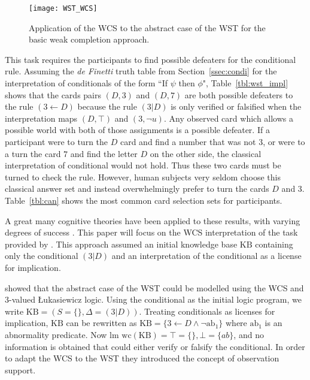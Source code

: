 \begin{figure}
\centering \texttt{[image: WST\_WCS]}
\caption{Application of the WCS to the abstract case of the WST for the basic weak completion approach.}
\label{wst_wcs}
\end{figure}

This task requires the participants to find possible defeaters for the conditional rule. Assuming the \textit{de Finetti} truth table from Section~\ref{ssec:condi} for the interpretation of conditionals of the form ``If $\psi$ then $\phi$", Table~\ref{tbl:wst_impl} shows that the cards pairs $(D,3)$ and $(D,7)$ are both possible defeaters to the rule $(3 \leftarrow D)$ because the rule $(3|D)$ is only verified or falsified when the interpretation maps $(D,\top)$ and $(3, \lnot u)$. Any observed card which allows a possible world with both of those assignments is a possible defeater. If a participant were to turn the $D$ card and find a number that was not $3$, or were to a turn the card $7$ and find the letter $D$ on the other side, the classical interpretation of conditional would not hold. Thus these two cards must be turned to check the rule. However, human subjects very seldom choose this classical answer set and instead overwhelmingly prefer to turn the cards $D$ and $3$. Table~\ref{tbl:can} shows the most common card selection sets for participants.

A great many cognitive theories have been applied to these results, with varying degrees of success \citep{ragni2017formal}. This paper will focus on the WCS interpretation of the task provided by \cite{ragni2017wason}. This approach assumed an initial knowledge base $\text{KB}$ containing only the conditional $(3|D)$ and an interpretation of the conditional as a license for implication.

\cite{dietz2012computational} showed that the abstract case of the WST could be modelled using the WCS and 3-valued \L ukasiewicz logic. Using the conditional as the initial logic program, we write $\text{KB}=(S=\{\},\Delta=(3|D))$. Treating conditionals as licenses for implication, $\text{KB}$ can be rewritten as $\text{KB}=\{3\leftarrow D \land \lnot \text{ab}_1\}$ where $\text{ab}_1$ is an abnormality predicate. Now $\textrm{lm wc}(\text{KB})=\top=\{\},\bot=\{ab\}$, and no information is obtained that could either verify or falsify the conditional. In order to adapt the WCS to the WST they introduced the concept of observation support.

